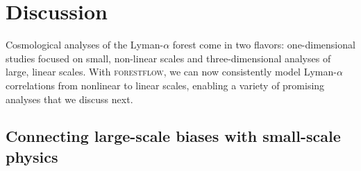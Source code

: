 \documentclass{aa}
\newcommand{\lya}{Lyman-$\alpha$\xspace}
\newcommand{\forestflow}{\textsc{forestflow}\xspace}
\begin{document}

\section{Discussion}
\label{sec:discussion}

Cosmological analyses of the \lya forest come in two flavors: one-dimensional studies focused on small, non-linear scales and three-dimensional analyses of large, linear scales. With \forestflow, we can now consistently model \lya correlations from nonlinear to linear scales, enabling a variety of promising analyses that we discuss next.


\subsection{Connecting large-scale biases with small-scale physics}
\label{sec:discussion_large_small}
\end{document}
